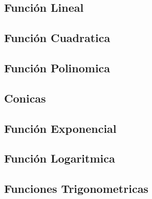 
\subsection{Función Lineal}
\subsection{Función Cuadratica}
\subsection{Función Polinomica}
\subsection{Conicas}
\subsection{Función Exponencial}
\subsection{Función Logaritmica}
\subsection{Funciones Trigonometricas}

